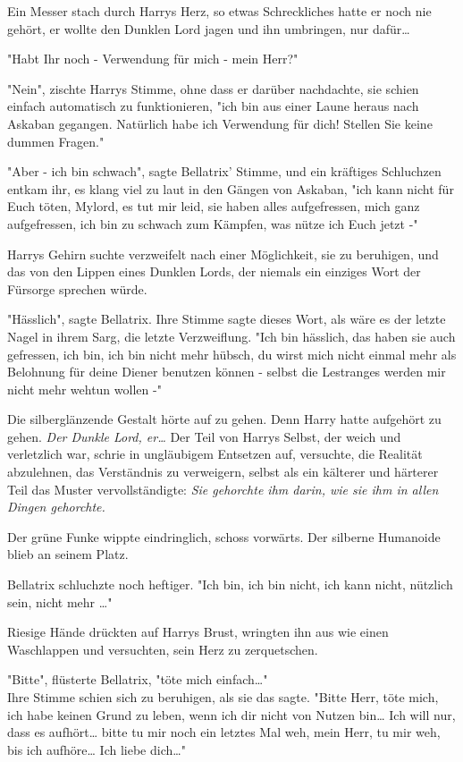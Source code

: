 {Ein Messer stach durch Harrys Herz, so etwas Schreckliches hatte er noch nie gehört, er wollte den Dunklen Lord jagen und ihn umbringen, nur dafür…

"Habt Ihr noch - Verwendung für mich - mein Herr?"

"Nein", zischte Harrys Stimme, ohne dass er darüber nachdachte, sie schien einfach automatisch zu funktionieren, "ich bin aus einer Laune heraus nach Askaban gegangen. Natürlich habe ich Verwendung für dich! Stellen Sie keine dummen Fragen."

"Aber - ich bin schwach", sagte Bellatrix' Stimme, und ein kräftiges Schluchzen entkam ihr, es klang viel zu laut in den Gängen von Askaban, "ich kann nicht für Euch töten, Mylord, es tut mir leid, sie haben alles aufgefressen, mich ganz aufgefressen, ich bin zu schwach zum Kämpfen, was nütze ich Euch jetzt -"

Harrys Gehirn suchte verzweifelt nach einer Möglichkeit, sie zu beruhigen, und das von den Lippen eines Dunklen Lords, der niemals ein einziges Wort der Fürsorge sprechen würde.

"Hässlich", sagte Bellatrix. Ihre Stimme sagte dieses Wort, als wäre es der letzte Nagel in ihrem Sarg, die letzte Verzweiflung. "Ich bin hässlich, das haben sie auch gefressen, ich bin, ich bin nicht mehr hübsch, du wirst mich nicht einmal mehr als Belohnung für deine Diener benutzen können - selbst die Lestranges werden mir nicht mehr wehtun wollen -"

Die silberglänzende Gestalt hörte auf zu gehen. Denn Harry hatte aufgehört zu gehen. \emph{Der Dunkle Lord, er…} Der Teil von Harrys Selbst, der weich und verletzlich war, schrie in ungläubigem Entsetzen auf, versuchte, die Realität abzulehnen, das Verständnis zu verweigern, selbst als ein kälterer und härterer Teil das Muster vervollständigte: \emph{Sie gehorchte ihm darin, wie sie ihm in allen Dingen gehorchte.}

Der grüne Funke wippte eindringlich, schoss vorwärts. Der silberne Humanoide blieb an seinem Platz.

Bellatrix schluchzte noch heftiger. "Ich bin, ich bin nicht, ich kann nicht, nützlich sein, nicht mehr …"

Riesige Hände drückten auf Harrys Brust, wringten ihn aus wie einen Waschlappen und versuchten, sein Herz zu zerquetschen.

"Bitte", flüsterte Bellatrix, "töte mich einfach…"\\ Ihre Stimme schien sich zu beruhigen, als sie das sagte. "Bitte Herr, töte mich, ich habe keinen Grund zu leben, wenn ich dir nicht von Nutzen bin… Ich will nur, dass es aufhört… bitte tu mir noch ein letztes Mal weh, mein Herr, tu mir weh, bis ich aufhöre… Ich liebe dich…"

}
